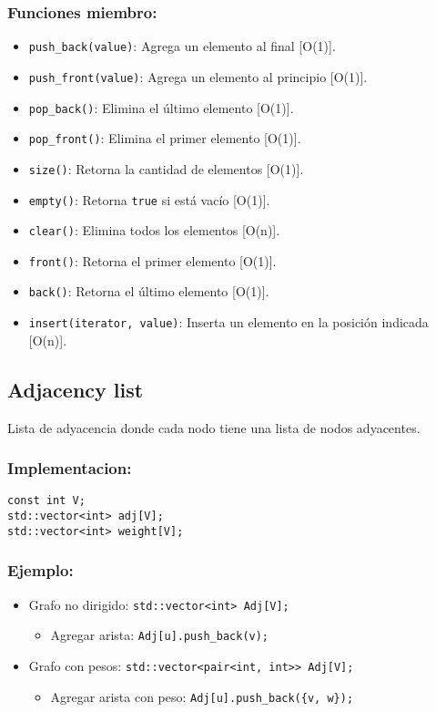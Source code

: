 \subsubsection*{Funciones miembro:}
\begin{itemize}
  \item \texttt{push\_back(value)}: Agrega un elemento al final [O(1)].
  \item \texttt{push\_front(value)}: Agrega un elemento al principio [O(1)].
  \item \texttt{pop\_back()}: Elimina el último elemento [O(1)].
  \item \texttt{pop\_front()}: Elimina el primer elemento [O(1)].
  \item \texttt{size()}: Retorna la cantidad de elementos [O(1)].
  \item \texttt{empty()}: Retorna \texttt{true} si está vacío [O(1)].
  \item \texttt{clear()}: Elimina todos los elementos [O(n)].
  \item \texttt{front()}: Retorna el primer elemento [O(1)].
  \item \texttt{back()}: Retorna el último elemento [O(1)].
  \item \texttt{insert(iterator, value)}: Inserta un elemento en la posición indicada [O(n)]. 
\end{itemize}

\subsection{Adjacency list}
\label{subsec:adjacency_list}
Lista de adyacencia donde cada nodo tiene una lista de nodos adyacentes.

\subsubsection*{Implementacion:}
\begin{lstlisting}
const int V;
std::vector<int> adj[V];
std::vector<int> weight[V];
\end{lstlisting}

\subsubsection*{Ejemplo:}
\begin{itemize}
  \item Grafo no dirigido: \texttt{std::vector<int> Adj[V];}
  \begin{itemize}
    \item Agregar arista: \texttt{Adj[u].push\_back(v);}
  \end{itemize}
  \item Grafo con pesos: \texttt{std::vector<pair<int, int>> Adj[V];}
  \begin{itemize}
    \item Agregar arista con peso: \texttt{Adj[u].push\_back(\{v, w\});}
  \end{itemize}
  
\end{itemize}

